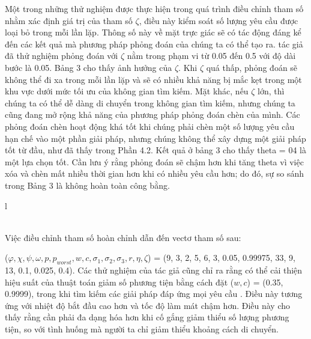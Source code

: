 Một trong những thử nghiệm được thực hiện trong quá trình điều chỉnh tham số nhằm xác định giá trị của tham số $\zeta$, điều này kiểm soát số lượng yêu cầu được loại bỏ trong mỗi lần lặp. Thông số này về mặt trực giác sẽ có tác động đáng kể đến các kết quả mà phương pháp phỏng đoán của chúng ta có thể tạo ra. tác giả đã thử nghiệm phỏng đoán với $\zeta$ nằm trong phạm vi từ 0.05 đến 0.5 với độ dài bước là 0.05. Bảng 3 cho thấy ảnh hưởng của $\zeta$.  Khi $\zeta$ quá thấp, phỏng đoán sẽ không thể đi xa trong mỗi lần lặp và sẽ có nhiều khả năng bị mắc kẹt trong một khu vực dưới mức tối ưu của không gian tìm kiếm. Mặt khác, nếu $\zeta$ lớn, thì chúng ta có thể dễ dàng di chuyển trong không gian tìm kiếm, nhưng chúng ta cũng đang mở rộng khả năng của phương pháp phỏng đoán chèn của mình. Các phỏng đoán chèn hoạt động khá tốt khi chúng phải chèn một số lượng yêu cầu hạn chế vào một phần giải pháp, nhưng chúng không thể xây dựng một giải pháp tốt từ đầu, như đã thấy trong Phần 4.2. Kết quả ở bảng 3 cho thấy theta = 04 là một lựa chọn tốt. Cần lưu ý rằng phỏng đoán sẽ chậm hơn khi tăng theta vì việc xóa và chèn mất nhiều thời gian hơn khi có nhiều yêu cầu hơn; do đó, sự so sánh trong Bảng 3 là không hoàn toàn công bằng.


\begin{longtable}[c]{l}
	 \\
    \\ [1ex]
    \caption*[]{ \textit{Ghi chú: Hàng đầu tiên hiển thị Các giá trị Của tham số $\zeta$ đã được kiểm tra và hàng thứ hai hiển thị khoảng cáCh giữa giải pháp trung bình thu được và giải pháp tốt nhất được tạo ra trong thử nghiệm.}}   
\end{longtable}

Việc điều chỉnh tham số hoàn chỉnh dẫn đến vectơ tham số sau:

($\varphi, \chi, \psi, \omega, p,  p_{worst}, w, c, \sigma_1, \sigma_2, \sigma_3, r, \eta, \zeta$) = (9, 3, 2, 5, 6, 3, 0.05, 0.99975, 33, 9, 13, 0.1, 0.025, 0.4). Các thử nghiệm của tác giả cũng chỉ ra rằng có thể cải thiện hiệu suất của thuật toán giảm số phương tiện bằng cách đặt ($w,c$)  = (0.35, 0.9999), trong khi tìm kiếm các giải pháp đáp ứng mọi yêu cầu . Điều này tương ứng với nhiệt độ bắt đầu cao hơn và tốc độ làm mát chậm hơn. Điều này cho thấy rằng cần phải đa dạng hóa hơn khi cố gắng giảm thiểu số lượng phương tiện, so với tình huống mà người ta chỉ giảm thiểu khoảng cách di chuyển.

